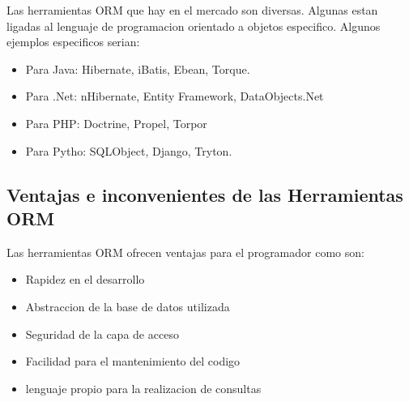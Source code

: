 \documentclass[twoside,twocolumn]{article}
\begin{document}
Las herramientas ORM que hay en el mercado son diversas. Algunas estan ligadas al lenguaje de programacion orientado a objetos especifico.
Algunos ejemplos especificos serian: 

\begin{itemize}
\item Para Java: Hibernate, iBatis, Ebean, Torque.
\item Para .Net: nHibernate, Entity Framework, DataObjects.Net
\item Para PHP: Doctrine, Propel, Torpor
\item Para Pytho: SQLObject, Django, Tryton.


\end{itemize}

\subsection{Ventajas e inconvenientes de las Herramientas ORM}

Las herramientas ORM ofrecen ventajas para el programador como son:
 \begin{itemize}
	 \item Rapidez en el desarrollo
	 \item Abstraccion de la base de datos utilizada
	 \item Seguridad de la capa de acceso
	 \item Facilidad para el mantenimiento del codigo
	 \item lenguaje propio para la realizacion de consultas
 \end{itemize}
\end{document}
